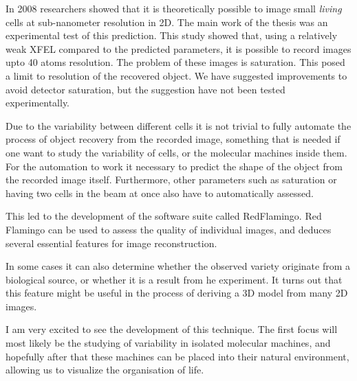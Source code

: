 In 2008 researchers showed that it is theoretically possible to image small \textit{living} cells at sub-nanometer resolution in 2D. The main work of the thesis was an experimental test of this prediction. This study showed that, using a relatively weak XFEL compared to the predicted parameters, it is possible to record images upto 40 atoms resolution. The problem of these images is saturation. This posed a limit to resolution of the recovered object. We have suggested improvements to avoid detector saturation, but the suggestion have not been tested experimentally.


Due to the variability between different cells it is not trivial to fully automate the process of object recovery from the recorded image, something that is needed if one want to study the variability of cells, or the molecular machines inside them. For the automation to work it necessary to predict the shape of the object from the recorded image itself. Furthermore, other parameters such as saturation or having two cells in the beam at once also have to automatically assessed.


This led to the development of the software suite called RedFlamingo. Red Flamingo can be used to assess the quality of individual images, and deduces several essential features for image reconstruction. 


In some cases it can also determine whether the observed variety originate from a biological source, or whether it is a result from he experiment. It turns out that this feature might be useful in the process of deriving a 3D model from many 2D images.


I am very excited to see the development of this technique. The first focus will most likely be the studying of variability in isolated molecular machines, and hopefully after that these machines can be placed into their natural environment, allowing us to visualize the organisation of life.